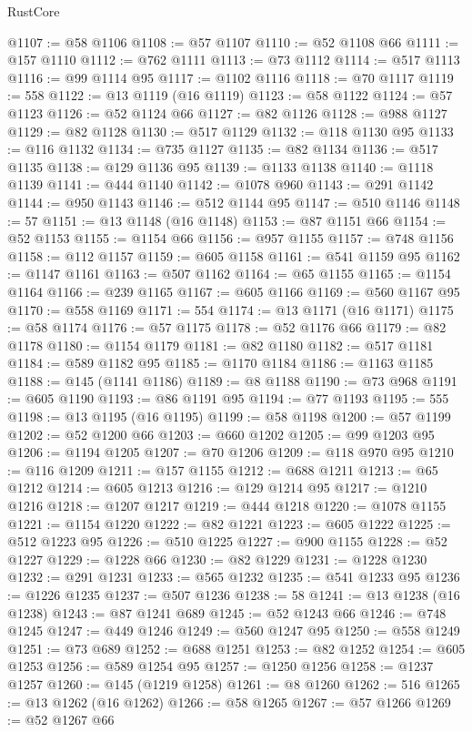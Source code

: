 \begin{lexlean}{RustCore}
\begin{coremodule}
@1107 := @58 @1106
@1108 := @57 @1107
@1110 := @52 @1108 @66
@1111 := @157 @1110
@1112 := @762 @1111
@1113 := @73 @1112
@1114 := @517 @1113
@1116 := @99 @1114 @95
@1117 := @1102 @1116
@1118 := @70 @1117
@1119 := 558
@1122 := @13 @1119 (@16 @1119)
@1123 := @58 @1122
@1124 := @57 @1123
@1126 := @52 @1124 @66
@1127 := @82 @1126
@1128 := @988 @1127
@1129 := @82 @1128
@1130 := @517 @1129
@1132 := @118 @1130 @95
@1133 := @116 @1132
@1134 := @735 @1127
@1135 := @82 @1134
@1136 := @517 @1135
@1138 := @129 @1136 @95
@1139 := @1133 @1138
@1140 := @1118 @1139
@1141 := @444 @1140
@1142 := @1078 @960
@1143 := @291 @1142
@1144 := @950 @1143
@1146 := @512 @1144 @95
@1147 := @510 @1146
@1148 := 57
@1151 := @13 @1148 (@16 @1148)
@1153 := @87 @1151 @66
@1154 := @52 @1153
@1155 := @1154 @66
@1156 := @957 @1155
@1157 := @748 @1156
@1158 := @112 @1157
@1159 := @605 @1158
@1161 := @541 @1159 @95
@1162 := @1147 @1161
@1163 := @507 @1162
@1164 := @65 @1155
@1165 := @1154 @1164
@1166 := @239 @1165
@1167 := @605 @1166
@1169 := @560 @1167 @95
@1170 := @558 @1169
@1171 := 554
@1174 := @13 @1171 (@16 @1171)
@1175 := @58 @1174
@1176 := @57 @1175
@1178 := @52 @1176 @66
@1179 := @82 @1178
@1180 := @1154 @1179
@1181 := @82 @1180
@1182 := @517 @1181
@1184 := @589 @1182 @95
@1185 := @1170 @1184
@1186 := @1163 @1185
@1188 := @145 (@1141 @1186)
@1189 := @8 @1188
@1190 := @73 @968
@1191 := @605 @1190
@1193 := @86 @1191 @95
@1194 := @77 @1193
@1195 := 555
@1198 := @13 @1195 (@16 @1195)
@1199 := @58 @1198
@1200 := @57 @1199
@1202 := @52 @1200 @66
@1203 := @660 @1202
@1205 := @99 @1203 @95
@1206 := @1194 @1205
@1207 := @70 @1206
@1209 := @118 @970 @95
@1210 := @116 @1209
@1211 := @157 @1155
@1212 := @688 @1211
@1213 := @65 @1212
@1214 := @605 @1213
@1216 := @129 @1214 @95
@1217 := @1210 @1216
@1218 := @1207 @1217
@1219 := @444 @1218
@1220 := @1078 @1155
@1221 := @1154 @1220
@1222 := @82 @1221
@1223 := @605 @1222
@1225 := @512 @1223 @95
@1226 := @510 @1225
@1227 := @900 @1155
@1228 := @52 @1227
@1229 := @1228 @66
@1230 := @82 @1229
@1231 := @1228 @1230
@1232 := @291 @1231
@1233 := @565 @1232
@1235 := @541 @1233 @95
@1236 := @1226 @1235
@1237 := @507 @1236
@1238 := 58
@1241 := @13 @1238 (@16 @1238)
@1243 := @87 @1241 @689
@1245 := @52 @1243 @66
@1246 := @748 @1245
@1247 := @449 @1246
@1249 := @560 @1247 @95
@1250 := @558 @1249
@1251 := @73 @689
@1252 := @688 @1251
@1253 := @82 @1252
@1254 := @605 @1253
@1256 := @589 @1254 @95
@1257 := @1250 @1256
@1258 := @1237 @1257
@1260 := @145 (@1219 @1258)
@1261 := @8 @1260
@1262 := 516
@1265 := @13 @1262 (@16 @1262)
@1266 := @58 @1265
@1267 := @57 @1266
@1269 := @52 @1267 @66

\end{coremodule}
\end{lexlean}
